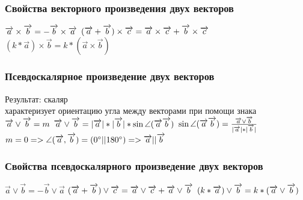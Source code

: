 \documentclass{article}
\begin{document}
\subsubsection{Свойства векторного произведения двух векторов}
$\overrightarrow{a}\times\overrightarrow{b}=-\overrightarrow{b}\times\overrightarrow{a}\\$
$(\overrightarrow{a}+\overrightarrow{b})\times\overrightarrow{c}=\overrightarrow{a}\times\overrightarrow{c}+\overrightarrow{b}\times\overrightarrow{c}\\$
$(k*\overrightarrow{a})\times\overrightarrow{b}=k*(\overrightarrow{a}\times\overrightarrow{b})$
\subsubsection{Псевдоскалярное произведение двух векторов}
Результат: скаляр\\
характеризует ориентацию угла между векторами при помощи знака\\
$\overrightarrow{a}\vee\overrightarrow{b}=m\\$
$\overrightarrow{a}\vee\overrightarrow{b}=|\overrightarrow{a}|*|\overrightarrow{b}|*\sin\angle(\overrightarrow{a}\overrightarrow{b})\\$
$\sin\angle(\overrightarrow{a}\overrightarrow{b})=\frac{\overrightarrow{a}\vee\overrightarrow{b}}{|\overrightarrow{a}|*|\overrightarrow{b}|}\\$
$m=0 => \angle(\overrightarrow{a},\overrightarrow{b})=(0^\circ||180^\circ) => \overrightarrow{a}||\overrightarrow{b}\\$
\subsubsection{Свойства псевдоскалярного произведение двух векторов}
$\overrightarrow{a}\vee\overrightarrow{b}=-\overrightarrow{b}\vee\overrightarrow{a}$
$(\overrightarrow{a}+\overrightarrow{b})\vee\overrightarrow{c}=\overrightarrow{a}\vee\overrightarrow{c}+\overrightarrow{a}\vee\overrightarrow{b}\\$
$(k*\overrightarrow{a})\vee\overrightarrow{b}=k*(\overrightarrow{a}\vee\overrightarrow{b})\\$
\end{document}
